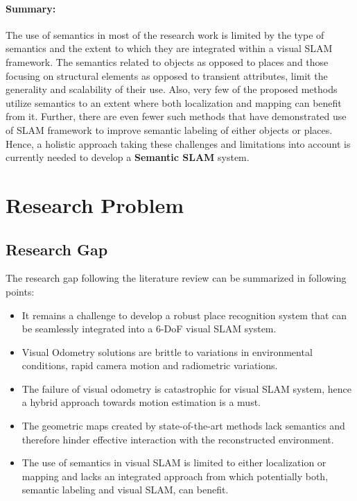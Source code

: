 \documentclass{article}
\begin{document}
\paragraph{Summary:}
The use of semantics in most of the research work is limited by the type of semantics and the extent to which they are integrated within a visual SLAM framework. The semantics related to objects as opposed to places and those focusing on structural elements as opposed to transient attributes, limit the generality and scalability of their use. Also, very few of the proposed methods utilize semantics to an extent where both localization and mapping can benefit from it. Further, there are even fewer such methods that have demonstrated use of SLAM framework to improve semantic labeling of either objects or places. Hence, a holistic approach taking these challenges and limitations into account is currently needed to develop a \textbf{Semantic SLAM} system.


\section{Research Problem}

\subsection{Research Gap}
The research gap following the literature review can be summarized in following points:
\begin{itemize}
 \item It remains a challenge to develop a robust place recognition system that can be seamlessly integrated into a 6-DoF visual SLAM system.
 \item Visual Odometry solutions are brittle to variations in environmental conditions, rapid camera motion and radiometric variations.
 \item The failure of visual odometry is catastrophic for visual SLAM system, hence a hybrid approach towards motion estimation is a must.
 \item The geometric maps created by state-of-the-art methods lack semantics and therefore hinder effective interaction with the reconstructed environment.
 \item The use of semantics in visual SLAM is limited to either localization or mapping and lacks an integrated approach from which potentially both, semantic labeling and visual SLAM, can benefit.
\end{itemize}
\end{document}
